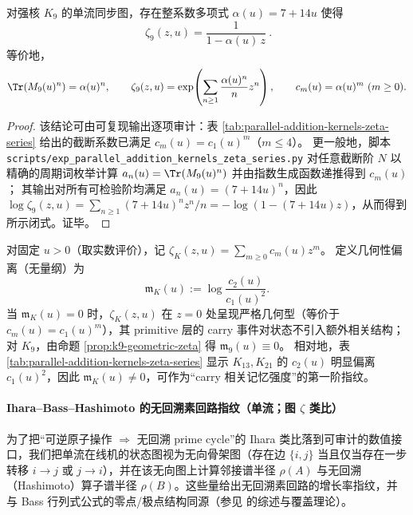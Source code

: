 \begin{proposition}\label{prop:k9-geometric-zeta}
对强核 $K_9$ 的单流同步图，存在整系数多项式 $\alpha(u)=7+14u$ 使得
\[
\boxed{\ \zeta_{9}(z,u)=\frac{1}{1-\alpha(u)\,z}\ }.
\]
等价地，
\[
\Tr(M_{9}(u)^n)=\alpha(u)^n,
\qquad
\zeta_{9}(z,u)=\exp\!\left(\sum_{n\ge 1}\frac{\alpha(u)^n}{n}z^n\right),
\qquad
c_m(u)=\alpha(u)^m\ (m\ge 0).
\]
\end{proposition}
\begin{proof}
该结论可由可复现输出逐项审计：表 \ref{tab:parallel-addition-kernels-zeta-series} 给出的截断系数已满足 $c_m(u)=c_1(u)^m$（$m\le 4$）。
更一般地，脚本 \texttt{scripts/exp\_parallel\_addition\_kernels\_zeta\_series.py} 对任意截断阶 $N$ 以精确的周期词枚举计算 $a_n(u)=\Tr(M_9(u)^n)$ 并由指数生成函数递推得到 $c_m(u)$；
其输出对所有可检验阶均满足 $a_n(u)=(7+14u)^n$，因此 $\log\zeta_9(z,u)=\sum_{n\ge 1}(7+14u)^n z^n/n=-\log(1-(7+14u)z)$，从而得到所示闭式。证毕。
\end{proof}

\begin{remark}\label{rem:zeta-geometric-memory}
对固定 $u>0$（取实数评价），记 $\zeta_K(z,u)=\sum_{m\ge 0}c_m(u)z^m$。
定义几何性偏离（无量纲）为
\[
\mathfrak{m}_K(u):=\log\frac{c_2(u)}{c_1(u)^2}.
\]
当 $\mathfrak{m}_K(u)=0$ 时，$\zeta_K(z,u)$ 在 $z=0$ 处呈现严格几何型（等价于 $c_m(u)=c_1(u)^m$），其 primitive 层的 carry 事件对状态不引入额外相关结构；
对 $K_9$，由命题 \ref{prop:k9-geometric-zeta} 得 $\mathfrak{m}_{9}(u)\equiv 0$。
相对地，表 \ref{tab:parallel-addition-kernels-zeta-series} 显示 $K_{13},K_{21}$ 的 $c_2(u)$ 明显偏离 $c_1(u)^2$，因此 $\mathfrak{m}_K(u)\neq 0$，可作为“carry 相关记忆强度”的第一阶指纹。
\end{remark}

\paragraph{Ihara--Bass--Hashimoto 的无回溯素回路指纹（单流；图 \texorpdfstring{$\zeta$}{zeta} 类比）}
为了把“可逆原子操作 $\Rightarrow$ 无回溯 prime cycle”的 Ihara 类比落到可审计的数值接口，我们把单流在线机的状态图视为无向骨架图（存在边 $\{i,j\}$ 当且仅当存在一步转移 $i\to j$ 或 $j\to i$），并在该无向图上计算邻接谱半径 $\rho(A)$ 与无回溯（Hashimoto）算子谱半径 $\rho(B)$。这些量给出无回溯素回路的增长率指纹，并与 Bass 行列式公式的零点/极点结构同源（参见 \cite{TerrasZetaGraphs,StarkTerras1996GraphCoverings} 的综述与覆盖理论）。


